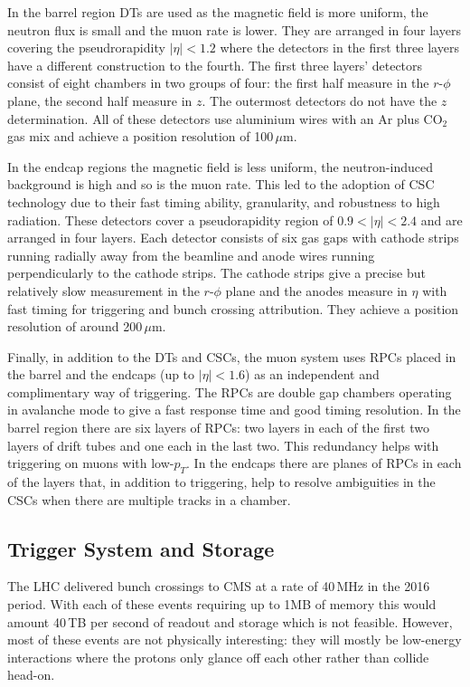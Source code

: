 In the barrel region DTs are used as the magnetic field is more uniform, the neutron flux is small and the muon rate is lower. They are arranged in four layers covering the pseudrorapidity $|\eta|<1.2$ where the detectors in the first three layers have a different construction to the fourth. The first three layers' detectors consist of eight chambers in two groups of four: the first half measure in the $r$-$\phi$ plane, the second half measure in $z$. The outermost detectors do not have the $z$ determination. All of these detectors use aluminium wires with an Ar plus CO$_{2}$ gas mix and achieve a position resolution of 100\,$\mu$m.


In the endcap regions the magnetic field is less uniform, the neutron-induced background is high and so is the muon rate. This led to the adoption of CSC technology due to their fast timing ability, granularity, and robustness to high radiation. 
These detectors cover a pseudorapidity region of $0.9<|\eta|<2.4$ and are arranged in four layers. Each detector consists of six gas gaps with cathode strips running radially away from the beamline and anode wires running perpendicularly to the cathode strips. The cathode strips give a precise but relatively slow measurement in the $r$-$\phi$ plane and the anodes measure in $\eta$ with fast timing for triggering and bunch crossing attribution. They achieve a position resolution of around 200\,$\mu$m. 


Finally, in addition to the DTs and CSCs, the muon system uses RPCs placed in the barrel and the endcaps (up to $|\eta|<1.6$) as an independent and complimentary way of triggering. 
The RPCs are double gap chambers operating in avalanche mode to give a fast response time and good timing resolution. In the barrel region there are six layers of RPCs: two layers in each of the first two layers of drift tubes and one each in the last two. This redundancy helps with triggering on muons with low-$p_{T}$. In the endcaps there are planes of RPCs in each of the layers that, in addition to triggering, help to resolve ambiguities in the CSCs when there are multiple tracks in a chamber. 


\subsection{Trigger System and Storage}
The LHC delivered bunch crossings to CMS at a rate of 40\,MHz in the 2016 period. With each of these events requiring up to 1MB of memory this would amount 40\,TB per second of readout and storage which is not feasible. 
However, most of these events are not physically interesting: they will mostly be low-energy interactions where the protons only glance off each other rather than collide head-on. 


